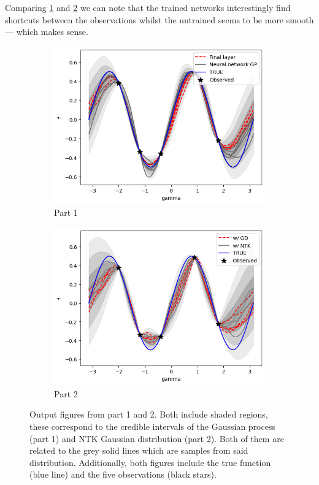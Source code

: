 \documentclass{amsart}
\numberwithin{equation}{section}
\numberwithin{table}{section}
\numberwithin{figure}{section}
\theoremstyle{plain}
\theoremstyle{definition}
\theoremstyle{remark}
\begin{document}
Comparing \ref{fig:NNasGP} and \ref{fig:NTK} we can note that the
trained networks interestingly find shortcuts between the observations
whilst the untrained seems to be more smooth --- which makes sense.

\begin{figure}[h]
  \centering
  \begin{subfigure}[b]{0.45\textwidth}
    \centering
    \includegraphics[width=1.2\textwidth]{part1}
    \caption{Part 1}
    \label{fig:NNasGP}
  \end{subfigure}
  \hfill
  \begin{subfigure}[b]{0.45\textwidth}
    \centering
    \includegraphics[width=1.2\textwidth]{part2}
    \caption{Part 2}
    \label{fig:NTK}
  \end{subfigure}
  \caption{Output figures from part 1 and 2. Both include shaded
    regions, these correspond to the credible intervals of the
    Gaussian process (part 1) and NTK Gaussian distribution (part
    2). Both of them are related to the grey solid lines which are
    samples from said distribution. Additionally, both figures include
    the true function (blue line) and the five observations (black
    stars). }
  \label{fig:results}
\end{figure}




\end{document}
